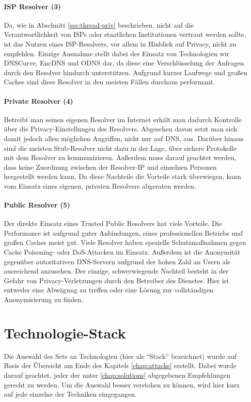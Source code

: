 \paragraph{ISP Resolver (3)}
Da, wie in Abschnitt \ref{sec:thread-priv} beschrieben, nicht auf die Verantwortlichkeit von ISPs oder staatlichen Institutionen vertraut werden sollte, ist das Nutzen eines ISP-Resolvers, vor allem in Hinblick auf Privacy, nicht zu empfehlen. Einzige Ausnahme stellt dabei der Einsatz von Technologien wir DNSCurve, EncDNS und ODNS dar, da diese eine Verschlüsselung der Anfragen durch den Resolver hindurch unterstützen. Aufgrund kurzer Laufwege und großen Caches sind diese Resolver in den meisten Fällen durchaus performant.

\paragraph{Private Resolver (4)}
Betreibt man seinen eigenen Resolver im Internet erhält man dadurch Kontrolle über die Privacy-Einstellungen des Resolvers. Abgesehen davon setzt man sich damit jedoch allen möglichen Angriffen, nicht nur auf DNS, aus. Darüber hinaus sind die meisten Stub-Resolver nicht dazu in der Lage, über sichere Protokolle mit dem Resolver zu kommunizieren. Außerdem muss darauf geachtet werden, dass keine Zuordnung zwischen der Resolver-IP und einzelnen Personen hergestellt werden kann. Da diese Nachteile die Vorteile stark überwiegen, kann vom Einsatz eines eigenen, privaten Resolvers abgeraten werden.

\paragraph{Public Resolver (5)}
Der direkte Einsatz eines Trusted Public Resolvers hat viele Vorteile. Die Performance ist aufgrund guter Anbindungen, eines professionellen Betriebs und großen Caches meist gut. Viele Resolver haben spezielle Schutzmaßnahmen gegen Cache Poisoning- oder DoS-Attacken im Einsatz. Außerdem ist die Anonymität gegenüber autoritativen DNS-Servern aufgrund der hohen Zahl an Usern als ausreichend anzusehen. Der einzige, schwerwiegende Nachteil besteht in der Gefahr von Privacy-Verletzungen durch den Betreiber des Dienstes. Hier ist entweder eine Abwägung zu treffen oder eine Lösung zur vollständigen Anonymisierung zu finden. 

\section{Technologie-Stack}
Die Auswahl des Sets an Technologien (hier als ``Stack'' bezeichnet) wurde auf Basis der Übersicht am Ende des Kapitels \ref{chap:attacks} erstellt. Dabei wurde darauf geachtet, jeder der unter \ref{chap:solutions} abgegebenen Empfehlungen gerecht zu werden. Um die Auswahl besser verstehen zu können, wird hier kurz auf jede einzelne der Techniken eingegangen.

